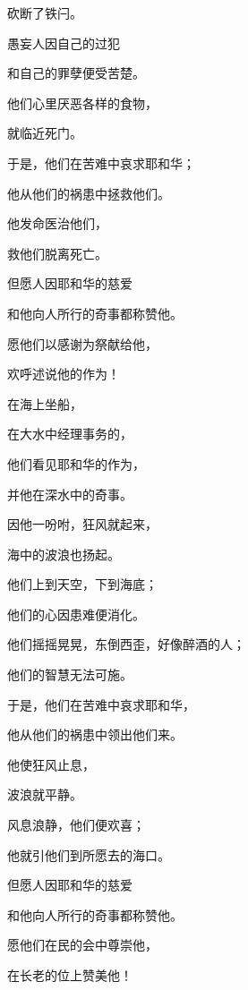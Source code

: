 {\par }{\Q 砍断了铁闩。
\par }{\BB \par }{\Q {}愚妄人因自己的过犯
\par }{\Q 和自己的罪孽便受苦楚。
\par }{\Q {}他们心里厌恶各样的食物，
\par }{\Q 就临近死门。
\par }{\Q {}于是，他们在苦难中哀求耶和华；
\par }{\Q 他从他们的祸患中拯救他们。
\par }{\Q {}他发命医治他们，
\par }{\Q 救他们脱离死亡。
\par }{\Q {}但愿人因耶和华的慈爱
\par }{\Q 和他向人所行的奇事都称赞他。
\par }{\Q {}愿他们以感谢为祭献给他，
\par }{\Q 欢呼述说他的作为！
\par }{\BB \par }{\Q {}在海上坐船，
\par }{\Q 在大水中经理事务的，
\par }{\Q {}他们看见耶和华的作为，
\par }{\Q 并他在深水中的奇事。
\par }{\Q {}因他一吩咐，狂风就起来，
\par }{\Q 海中的波浪也扬起。
\par }{\Q {}他们上到天空，下到海底；
\par }{\Q 他们的心因患难便消化。
\par }{\Q {}他们摇摇晃晃，东倒西歪，好像醉酒的人；
\par }{\Q 他们的智慧无法可施。
\par }{\Q {}于是，他们在苦难中哀求耶和华，
\par }{\Q 他从他们的祸患中领出他们来。
\par }{\Q {}他使狂风止息，
\par }{\Q 波浪就平静。
\par }{\Q {}风息浪静，他们便欢喜；
\par }{\Q 他就引他们到所愿去的海口。
\par }{\Q {}但愿人因耶和华的慈爱
\par }{\Q 和他向人所行的奇事都称赞他。
\par }{\Q {}愿他们在民的会中尊崇他，
\par }{\Q 在长老的位上赞美他！
}
